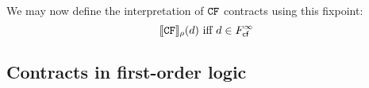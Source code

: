 We may now define the interpretation of ${\tt CF}$ contracts using this fixpoint: 
\[     [\![{\tt CF}]\!]_\rho(d) \mbox{ iff }  d \in F_{\textsf{cf}}^{\infty}    \] 




\subsection{Contracts in first-order logic}\label{sect:contracts-fol}

